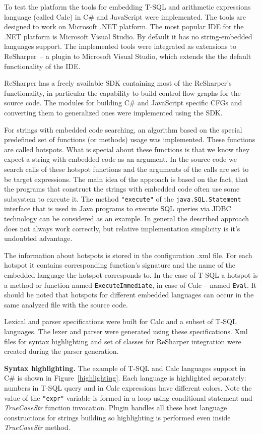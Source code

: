 \documentclass{sig-alternate-05-2015}
\begin{document}
To test the platform the tools for embedding T-SQL and arithmetic expressions language (called Calc) in C\# and JavaScript were implemented. The tools are designed to work on Microsoft .NET platform. The most popular IDE for the .NET platform is Microsoft Visual Studio. By default it has no string-embedded languages support. The implemented tools were integrated as extensions to ReSharper~--  a plugin to Microsoft Visual Studio, which extends the the default functionality of the IDE.

ReSharper has a freely available SDK containing most of the ReSharper's functionality, in particular the capability to build control flow graphs for the source code. The modules for building C\# and JavaScript specific CFGs and converting them to generalized ones were implemented using the SDK.

For strings with embedded code searching, an algorithm based on the special predefined set of functions (or methods) usage was implemented. These functions are called hotspots. What is special about these functions is that we know they expect a string with embedded code as an argument. In the source code we search calls of these hotspot functions and the arguments of the calls are set to be target expressions. The main idea of the approach is based on the fact, that the programs that construct the strings with embedded code often use some subsystem to execute it. The method \verb|"execute"| of the \verb|java.SQL.Statement| interface that is used in Java programs to execute SQL queries via JDBC technology can be considered as an example. In general the described approach does not always work correctly, but relative implementation simplicity is it's undoubted advantage.

The information about hotspots is stored in the configuration .xml file. For each hotspot it contains corresponding function's signature and the name of the embedded language the hotspot corresponds to. In the case of T-SQL a hotspot is a method or function named \verb|ExecuteImmediate|, in case of Calc -- named \verb|Eval|. It should be noted that hotspots for different embedded languages can occur in the same analyzed file with the source code.

Lexical and parser specifications were built for Calc and a subset of T-SQL languages. The lexer and parser were generated using these specifications. Xml files for syntax highlighting and set of classes for ReSharper integration were created during the parser generation.

\textbf{Syntax highlighting.} The example of T-SQL and Calc languages support in C\# is shown in Figure~\ref{highlighting}. Each language is highlighted separately: numbers in T-SQL query and in Calc expressions have different colors. Note the value of the \verb|"expr"| variable is formed in a loop using conditional statement and \textit{TrueCaseStr} function invocation. Plugin handles all these host language constructions for strings building so highlighting is performed even inside \textit{TrueCaseStr} method. 
\end{document}

